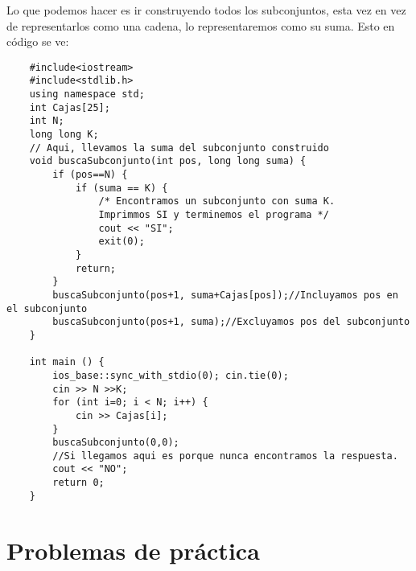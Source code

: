 Lo que podemos hacer es ir construyendo todos los subconjuntos, esta vez en vez de representarlos como una cadena, lo representaremos como su suma. Esto en código se ve:
\newpage
\begin{lstlisting}
	#include<iostream>
	#include<stdlib.h>
	using namespace std;
	int Cajas[25];
	int N;
	long long K;
	// Aqui, llevamos la suma del subconjunto construido
	void buscaSubconjunto(int pos, long long suma) {
		if (pos==N) {
			if (suma == K) {
				/* Encontramos un subconjunto con suma K.
				Imprimmos SI y terminemos el programa */
				cout << "SI";
				exit(0);
			}
			return;
		}
		buscaSubconjunto(pos+1, suma+Cajas[pos]);//Incluyamos pos en el subconjunto
		buscaSubconjunto(pos+1, suma);//Excluyamos pos del subconjunto	
	}
	
	int main () {
		ios_base::sync_with_stdio(0); cin.tie(0);
		cin >> N >>K;
		for (int i=0; i < N; i++) {
			cin >> Cajas[i];
		}
		buscaSubconjunto(0,0);
		//Si llegamos aqui es porque nunca encontramos la respuesta.
		cout << "NO";
		return 0;
	}
\end{lstlisting}

\pagebreak

\section*{Problemas de práctica}

\begin{exercise}
\end{exercise}

\begin{exercise}
\end{exercise}
\begin{exercise}	
\end{exercise}
\begin{exercise}
\end{exercise}
